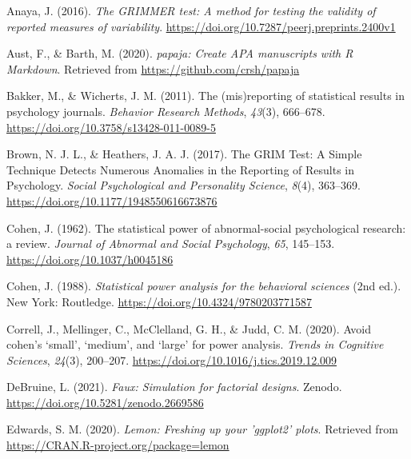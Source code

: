 \documentclass[
  english,
  man, donotrepeattitle,floatsintext]{apa7}
\newlength{\cslhangindent}
\newlength{\cslentryspacingunit} %
\newenvironment{CSLReferences}[2] %
 {%
  \setlength{\parindent}{0pt}
  \ifodd #1
  \let\oldpar\par
  \def\par{\hangindent=\cslhangindent\oldpar}
  \fi
  \setlength{\parskip}{#2\cslentryspacingunit}
 }%
 {}
\begin{document}
\hypertarget{refs}{}
\begin{CSLReferences}{1}{0}
\leavevmode{}%
Anaya, J. (2016). \emph{The GRIMMER test: A method for testing the validity of reported measures of variability}. \url{https://doi.org/10.7287/peerj.preprints.2400v1}

\leavevmode{}%
Aust, F., \& Barth, M. (2020). \emph{{papaja}: {Create} {APA} manuscripts with {R Markdown}}. Retrieved from \url{https://github.com/crsh/papaja}

\leavevmode{}%
Bakker, M., \& Wicherts, J. M. (2011). The (mis)reporting of statistical results in psychology journals. \emph{Behavior Research Methods}, \emph{43}(3), 666--678. \url{https://doi.org/10.3758/s13428-011-0089-5}

\leavevmode{}%
Brown, N. J. L., \& Heathers, J. A. J. (2017). The GRIM Test: A Simple Technique Detects Numerous Anomalies in the Reporting of Results in Psychology. \emph{Social Psychological and Personality Science}, \emph{8}(4), 363--369. \url{https://doi.org/10.1177/1948550616673876}

\leavevmode{}%
Cohen, J. (1962). The statistical power of abnormal-social psychological research: a review. \emph{Journal of Abnormal and Social Psychology}, \emph{65}, 145--153. \url{https://doi.org/10.1037/h0045186}

\leavevmode{}%
Cohen, J. (1988). \emph{Statistical power analysis for the behavioral sciences} (2nd ed.). New York: Routledge. \url{https://doi.org/10.4324/9780203771587}

\leavevmode{}%
Correll, J., Mellinger, C., McClelland, G. H., \& Judd, C. M. (2020). Avoid cohen{'}s {`}small{'}, {`}medium{'}, and {`}large{'} for power analysis. \emph{Trends in Cognitive Sciences}, \emph{24}(3), 200--207. \url{https://doi.org/10.1016/j.tics.2019.12.009}

\leavevmode{}%
DeBruine, L. (2021). \emph{Faux: Simulation for factorial designs}. Zenodo. \url{https://doi.org/10.5281/zenodo.2669586}

\leavevmode{}%
Edwards, S. M. (2020). \emph{Lemon: Freshing up your 'ggplot2' plots}. Retrieved from \url{https://CRAN.R-project.org/package=lemon}


\end{CSLReferences}
\end{document}
